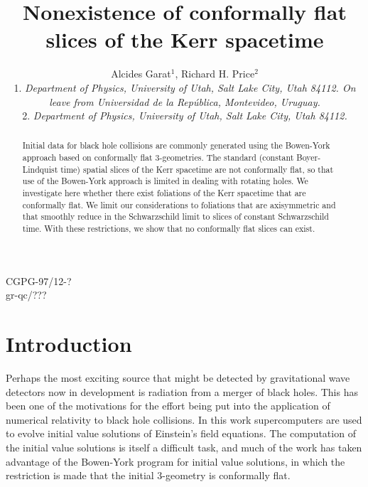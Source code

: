 %

\title{Nonexistence of  conformally flat slices of the Kerr spacetime}
\author{Alcides Garat$^1$,
Richard H. Price$^2$\\
1. {\it Department of Physics, University of Utah, Salt Lake City, Utah
84112. On leave from Universidad de la Rep\'ublica, Montevideo, Uruguay.}\\
2. {\it Department of Physics, University of Utah, Salt Lake City, Utah
84112.}}

\maketitle
\begin{abstract}

Initial data for black hole collisions are commonly generated using
the Bowen-York approach based on conformally flat 3-geometries.  The
standard (constant Boyer-Lindquist time) spatial slices of the Kerr
spacetime are not conformally flat, so that use of the Bowen-York
approach is limited in dealing with rotating holes. We investigate
here whether there exist foliations of the Kerr spacetime that are
conformally flat. We limit our considerations to foliations that are
axisymmetric and that smoothly reduce in the Schwarzschild limit to
slices of constant Schwarzschild time. With these restrictions, we
show that no conformally flat slices can exist.

\end{abstract}
\vspace{-8.5cm} 
\begin{flushright}
\baselineskip=15pt
CGPG-97/12-?  \\
gr-qc/???\\
\end{flushright}
\vspace{7.5cm}

\section{Introduction}




Perhaps the most exciting source that might be detected by
gravitational wave detectors now in development is radiation from a
merger of black holes. This has been one of the motivations for the
effort being put into the application of numerical relativity to black
hole collisions. In this work supercomputers are used to evolve
initial value solutions of Einstein's field equations. The computation
of the initial value solutions is itself a difficult task, and much of
the work has taken advantage of the Bowen-York \cite{BowenYork}
program for initial value solutions, in which the restriction is made
that the initial 3-geometry is conformally flat.


